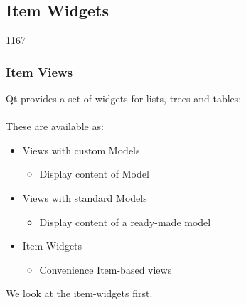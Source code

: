 %
%
%
%

\subsection{Item Widgets}
\begin{slide}[fragile]{1167}\frametitle{Item Views}
  Qt provides a set of widgets for lists, trees and tables: \\
  \medspace
   \\
  \medspace
  These are available as: \\
  \begin{itemize}
  \item Views with custom Models
    \begin{itemize}
    \item Display content of Model
    \end{itemize}
  \item Views with standard Models
    \begin{itemize}
    \item Display content of a ready-made model
    \end{itemize}
  \item Item Widgets
    \begin{itemize}
    \item Convenience Item-based views
    \end{itemize}
\end{itemize}

We look at the item-widgets first.
\end{slide}

